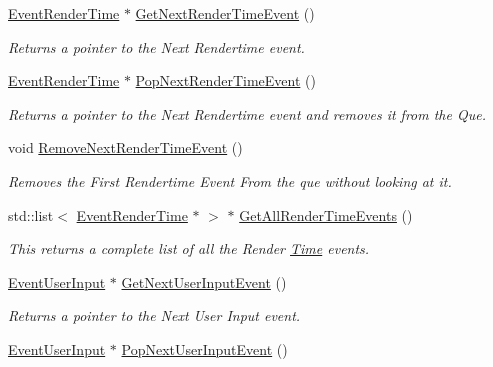 \begin{DoxyCompactItemize}
\hyperlink{classphys_1_1EventRenderTime}{EventRenderTime} $\ast$ \hyperlink{classphys_1_1EventManager_ae8730b039a280449af052d75f2e60b06}{GetNextRenderTimeEvent} ()
\begin{DoxyCompactList}\small\item\em Returns a pointer to the Next Rendertime event. \item\end{DoxyCompactList}\item 
\hyperlink{classphys_1_1EventRenderTime}{EventRenderTime} $\ast$ \hyperlink{classphys_1_1EventManager_aa7e800d34ad8b9295ac87dfa822a2a03}{PopNextRenderTimeEvent} ()
\begin{DoxyCompactList}\small\item\em Returns a pointer to the Next Rendertime event and removes it from the Que. \item\end{DoxyCompactList}\item 
void \hyperlink{classphys_1_1EventManager_af1204912be3554312e66d3a777c1f99b}{RemoveNextRenderTimeEvent} ()
\begin{DoxyCompactList}\small\item\em Removes the First Rendertime Event From the que without looking at it. \item\end{DoxyCompactList}\item 
std::list$<$ \hyperlink{classphys_1_1EventRenderTime}{EventRenderTime} $\ast$ $>$ $\ast$ \hyperlink{classphys_1_1EventManager_aee73dff2d113826b8c01db7f7417d527}{GetAllRenderTimeEvents} ()
\begin{DoxyCompactList}\small\item\em This returns a complete list of all the Render \hyperlink{structphys_1_1Time}{Time} events. \item\end{DoxyCompactList}\item 
\hyperlink{classphys_1_1EventUserInput}{EventUserInput} $\ast$ \hyperlink{classphys_1_1EventManager_a38b42602a3a4d621048c78b525b4db49}{GetNextUserInputEvent} ()
\begin{DoxyCompactList}\small\item\em Returns a pointer to the Next User Input event. \item\end{DoxyCompactList}\item 
\hyperlink{classphys_1_1EventUserInput}{EventUserInput} $\ast$ \hyperlink{classphys_1_1EventManager_afa89317d4b16c2b7065b9f79a4354654}{PopNextUserInputEvent} ()

\end{DoxyCompactItemize}
